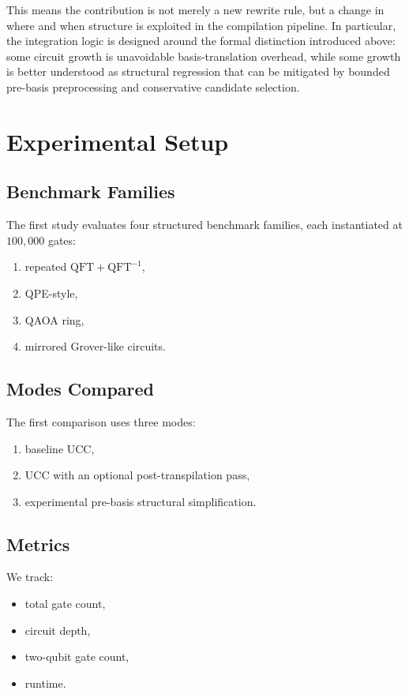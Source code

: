 \documentclass[11pt]{article}
\begin{document}
This means the contribution is not merely a new rewrite rule, but a change in where and when structure is exploited in the compilation pipeline. In particular, the integration logic is designed around the formal distinction introduced above: some circuit growth is unavoidable basis-translation overhead, while some growth is better understood as structural regression that can be mitigated by bounded pre-basis preprocessing and conservative candidate selection.

\section{Experimental Setup}

\subsection{Benchmark Families}

The first study evaluates four structured benchmark families, each instantiated at $100{,}000$ gates:
\begin{enumerate}[leftmargin=1.5em]
    \item repeated $\mathrm{QFT}+\mathrm{QFT}^{-1}$,
    \item QPE-style,
    \item QAOA ring,
    \item mirrored Grover-like circuits.
\end{enumerate}

\subsection{Modes Compared}

The first comparison uses three modes:
\begin{enumerate}[leftmargin=1.5em]
    \item baseline UCC,
    \item UCC with an optional post-transpilation pass,
    \item experimental pre-basis structural simplification.
\end{enumerate}

\subsection{Metrics}

We track:
\begin{itemize}[leftmargin=1.5em]
    \item total gate count,
    \item circuit depth,
    \item two-qubit gate count,
    \item runtime.
\end{itemize}
\end{document}
